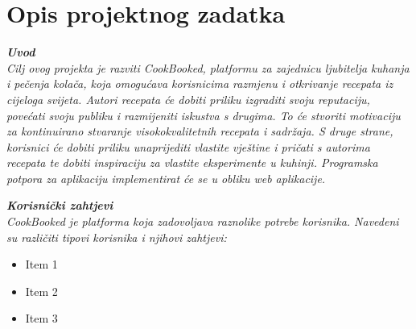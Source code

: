 \chapter{Opis projektnog zadatka}
		
		\textbf{\textit{Uvod}}\\
		
		\textit{Cilj ovog projekta je razviti CookBooked, platformu za zajednicu ljubitelja kuhanja i pečenja kolača, koja omogućava korisnicima razmjenu i otkrivanje recepata iz cijeloga svijeta. Autori recepata će dobiti priliku izgraditi svoju reputaciju, povećati svoju publiku i razmijeniti iskustva s drugima. To će stvoriti motivaciju za kontinuirano stvaranje visokokvalitetnih recepata i sadržaja. S druge strane, korisnici će dobiti priliku unaprijediti vlastite vještine i pričati s autorima recepata te dobiti inspiraciju za vlastite eksperimente u kuhinji. Programska potpora za aplikaciju implementirat će se u obliku web aplikacije.}
		
		\vspace{\baselineskip} %

		\textbf{\textit{Korisnički zahtjevi}}\\
		
		\textit{CookBooked je platforma koja zadovoljava raznolike potrebe korisnika. Navedeni su različiti tipovi korisnika i njihovi zahtjevi:}
		\begin{itemize}
			\item Item 1
			\item Item 2
			\item Item 3
		\end{itemize}
		
		\eject
		
	